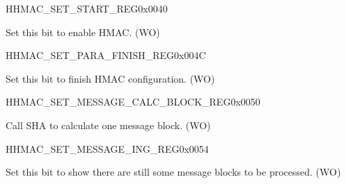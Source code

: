 \begin{register}{H}{HMAC\_SET\_START\_REG}{0x0040}\label{regdesc:HMACSETSTARTREG}
%
%
\regnewline%
\begin{regdesc}\begin{reglist}
\label{fielddesc:HMACSETSTART}\item [HMAC\_SET\_START] Set this bit to enable HMAC. (WO)
\end{reglist}\end{regdesc}
\end{register}


\begin{register}{H}{HMAC\_SET\_PARA\_FINISH\_REG}{0x004C}\label{regdesc:HMACSETPARAFINISHREG}
%
%
\regnewline%
\begin{regdesc}\begin{reglist}
\label{fielddesc:HMACSETPARAEND}\item [HMAC\_SET\_PARA\_END] Set this bit to finish HMAC configuration. (WO)
\end{reglist}\end{regdesc}
\end{register}


\begin{register}{H}{HMAC\_SET\_MESSAGE\_CALC\_BLOCK\_REG}{0x0050}\label{regdesc:HMACSETMESSAGEONEREG}
%
%
\regnewline%
\begin{regdesc}\begin{reglist}
\label{fielddesc:HMACSETTEXTONE}\item [HMAC\_SET\_TEXT\_ONE] Call SHA to calculate one message block. (WO)
\end{reglist}\end{regdesc}
\end{register}


\begin{register}{H}{HMAC\_SET\_MESSAGE\_ING\_REG}{0x0054}\label{regdesc:HMACSETMESSAGEINGREG}
%
%
\regnewline%
\begin{regdesc}\begin{reglist}
\label{fielddesc:HMACSETTEXTING}\item [HMAC\_SET\_TEXT\_ING] Set this bit to show there are still some message blocks to be processed. (WO)
\end{reglist}\end{regdesc}
\end{register}


